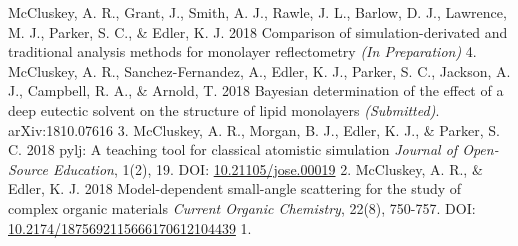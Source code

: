 \begin{cvpubys}
  \cvpuby
    {McCluskey, A. R., Grant, J., Smith, A. J., Rawle, J. L., Barlow, D. J., Lawrence, M. J., Parker, S. C., \& Edler, K. J.}
    {2018}
    {Comparison of simulation-derivated and traditional analysis methods for monolayer reflectometry}
    {\emph{(In Preparation)}}
    {4.}
  \cvpuby
  	{McCluskey, A. R., Sanchez-Fernandez, A., Edler, K. J., Parker, S. C., Jackson, A. J., Campbell, R. A., \& Arnold, T.}
    {2018}
    {Bayesian determination of the effect of a deep eutectic solvent on the structure of lipid monolayers}
    {\emph{(Submitted)}. arXiv:1810.07616}
    {3.}
  \cvpuby
  	{McCluskey, A. R., Morgan, B. J., Edler, K. J., \& Parker, S. C.}
  	{2018}
  	{pylj: A teaching tool for classical atomistic simulation}
  	{\emph{Journal of Open-Source Education}, 1(2), 19. DOI: \href{http://doi.org/10.21105/jose.00019}{10.21105/jose.00019}}
  	{2.}
  \cvpuby
    {McCluskey, A. R., \& Edler, K. J.}
    {2018}
    {Model-dependent small-angle scattering for the study of complex organic materials}
	  {\emph{Current Organic Chemistry}, 22(8), 750-757. DOI: \href{http://doi.org/10.2174/1875692115666170612104439}{10.2174/1875692115666170612104439}}
    {1.}
\end{cvpubys}

